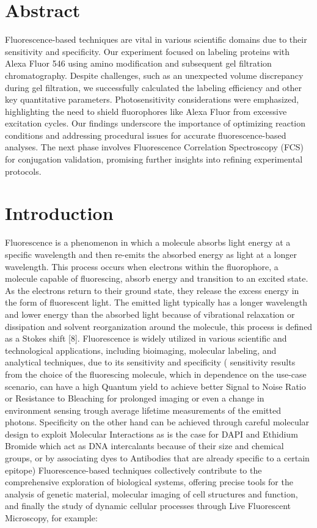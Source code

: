 \documentclass[a4paper,english,12pt,bibliography=totoc]{scrreprt}
\begin{document}
\chapter{Abstract}
\label{cha:abstract}
Fluorescence-based techniques are vital in various scientific domains due to their sensitivity and specificity. Our experiment focused on labeling proteins with Alexa Fluor 546 using amino modification and subsequent gel filtration chromatography. Despite challenges, such as an unexpected volume discrepancy during gel filtration, we successfully calculated the labeling efficiency and other key quantitative parameters. Photosensitivity considerations were emphasized, highlighting the need to shield fluorophores like Alexa Fluor from excessive excitation cycles. Our findings underscore the importance of optimizing reaction conditions and addressing procedural issues for accurate fluorescence-based analyses. The next phase involves Fluorescence Correlation Spectroscopy (FCS) for conjugation validation, promising further insights into refining experimental protocols.
\chapter{Introduction}
\label{cha:intro}
Fluorescence is a phenomenon in which a molecule absorbs light energy at a specific wavelength and then re-emits the absorbed energy as light at a longer wavelength. This process occurs when electrons within the fluorophore, a molecule capable of fluorescing, absorb energy and transition to an excited state. As the electrons return to their ground state, they release the excess energy in the form of fluorescent light. The emitted light typically has a longer wavelength and lower energy than the absorbed light because of vibrational relaxation or dissipation and solvent reorganization around the molecule, this process is defined as a Stokes shift [8]. Fluorescence is widely utilized in various scientific and technological applications, including bioimaging, molecular labeling, and analytical techniques, due to its sensitivity and specificity ( sensitivity results from the choice of the fluorescing molecule, which in dependence on the use-case scenario, can have a high Quantum yield to achieve better Signal to Noise Ratio or Resistance to Bleaching for prolonged imaging or even a change in environment sensing trough average lifetime measurements of the emitted photons.
Specificity on the other hand can be achieved through careful molecular design to exploit Molecular Interactions as is the case for DAPI and Ethidium Bromide which act as DNA intercalants because of their size and chemical groups, or by associating dyes to Antibodies that are already specific to a certain epitope) 
Fluorescence-based techniques collectively contribute to the comprehensive exploration of biological systems, offering precise tools for the analysis of genetic material, molecular imaging of cell structures and function, and finally the study of dynamic cellular processes through Live Fluorescent Microscopy, for example:
\newline
\end{document}
